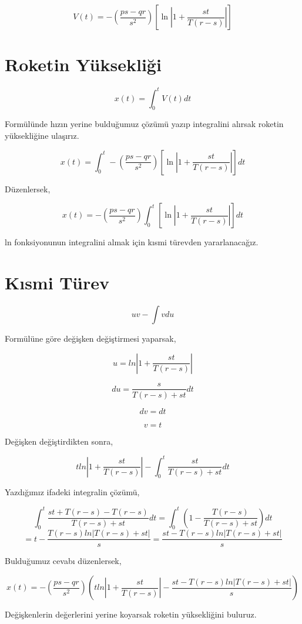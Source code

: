 \documentclass[a4paper,10pt]{article}
\begin{document}
\[
 V(t) =  -(\frac{ps-qr}{s^2})[\ln|1 + \frac{st}{T(r-s)}|]
\]
\section{Roketin Yüksekliği}
\[ x(t) = \int_{0}^{t}{V(t)}dt
\]

 Formülünde hızın yerine bulduğumuz çözümü yazıp integralini alırsak roketin yüksekliğine ulaşırız.

 \[
 x(t) = \int_{0}^{t}-(\frac{ps-qr}{s^2})[\ln|1 + \frac{st}{T(r-s)}|]dt
 \]
 
 Düzenlersek,
 
 \[
 x(t) = -(\frac{ps-qr}{s^2})\int_{0}^{t}[\ln|1 + \frac{st}{T(r-s)}|]dt
 \]
 
  ln fonksiyonunun integralini almak için kısmi türevden yararlanacağız.
 
 \section{Kısmi Türev}
 
\[
 uv - \int vdu
\]

Formülüne göre değişken değiştirmesi yaparsak,

\[
 u = ln|1 + \frac{st}{T(r-s)}|
\]

\[
 du = \frac{s}{T(r-s) + st}dt
\]

\[
 dv = dt
\]

\[
 v = t
\]

Değişken değiştirdikten sonra,

\[
 tln|1 + \frac{st}{T(r-s)}| - \int_{0}^{t}\frac{st}{T(r-s) + st}dt
\]

Yazdığımız ifadeki integralin çözümü,

\[
   \int_{0}^{t}\frac{st + T(r-s) - T(r-s)}{T(r-s) + st}dt = \int_{0}^{t}( 1 -\frac{T(r-s)}{T(r-s) + st})dt
\]
\[
 = t - \frac{T(r-s)ln|{T(r-s) + st}|}{s} =  \frac{st -T(r-s)ln|{T(r-s) + st}|}{s}
\]

Bulduğumuz cevabı düzenlersek,

\[x(t) =  -(\frac{ps-qr}{s^2})(tln|1 + \frac{st}{T(r-s)}| - \frac{st -T(r-s)ln|{T(r-s) + st}|}{s})
\]

Değişkenlerin değerlerini yerine koyarsak roketin yüksekliğini buluruz.
\end{document}
